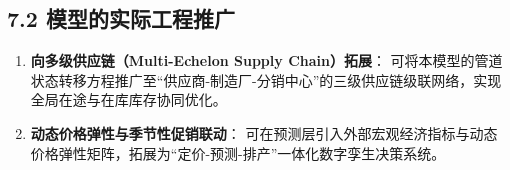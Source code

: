 \subsection{7.2
模型的实际工程推广}\label{ux6a21ux578bux7684ux5b9eux9645ux5de5ux7a0bux63a8ux5e7f}

\begin{enumerate}
\def\labelenumi{\arabic{enumi}.}
\tightlist
\item
  \textbf{向多级供应链（Multi-Echelon Supply Chain）拓展}：
  可将本模型的管道状态转移方程推广至``供应商-制造厂-分销中心''的三级供应链级联网络，实现全局在途与在库库存协同优化。
\item
  \textbf{动态价格弹性与季节性促销联动}：
  可在预测层引入外部宏观经济指标与动态价格弹性矩阵，拓展为``定价-预测-排产''一体化数字孪生决策系统。
\end{enumerate}
